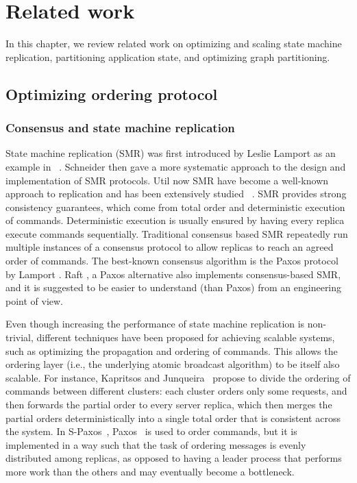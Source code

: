 \chapter[Related work]{Related work}
\label{sec:rw}

In this chapter, we review related work on optimizing and scaling state machine
replication, partitioning application state, and optimizing graph partitioning.

\section{Optimizing ordering protocol}

\subsection{Consensus and state machine replication}
State machine replication (SMR) was first introduced by Leslie Lamport as an
example in ~\cite{Lam78}. Schneider \cite{Sch90} then gave a more systematic
approach to the design and implementation of SMR protocols. Util now SMR have
become a well-known approach to replication and has been extensively studied
~\cite{Kapritsos:2012um, Kotla:2004ep, santos2013htsmr}. SMR provides strong
consistency guarantees, which come from total order and deterministic execution
of commands. Deterministic execution is usually ensured by having every replica
execute commands sequentially. Traditional consensus based SMR repeatedly run
multiple instances of a consensus protocol to allow replicas to reach an agreed
order of commands. The best-known consensus algorithm is the Paxos protocol by
Lamport \cite{Lam98}. Raft \cite{184040}, a Paxos alternative also
implements consensus-based SMR, and it is suggested to be easier to understand
(than Paxos) from an engineering point of view.

Even though increasing the performance of state machine replication is
non-trivial, different techniques have been proposed for achieving scalable
systems, such as optimizing the propagation and ordering of commands. This
allows the ordering layer (i.e., the underlying atomic broadcast algorithm) to
be itself also scalable. For instance, Kapritsos and
Junqueira~\cite{kapritsos2010scalable} propose to divide the ordering of
commands between different clusters: each cluster orders only some requests, and
then forwards the partial order to every server replica, which then merges the
partial orders deterministically into a single total order that is consistent
across the system. In S-Paxos~\cite{biely2012spaxos}, Paxos~\cite{Lam98} is used
to order commands, but it is implemented in a way such that the task of ordering
messages is evenly distributed among replicas, as opposed to having a leader
process that performs more work than the others and may eventually become a
bottleneck.

